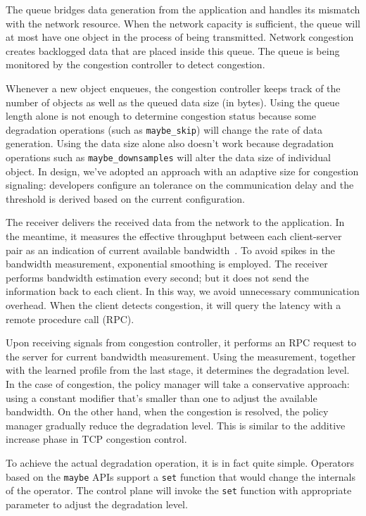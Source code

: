  The queue bridges data generation from the
application and handles its mismatch with the network resource. When the network
capacity is sufficient, the queue will at most have one object in the process of
being transmitted. Network congestion creates backlogged data that are placed
inside this queue. The queue is being monitored by the congestion controller to
detect congestion.

 Whenever a new object enqueues, the congestion
controller keeps track of the number of objects as well as the queued data size
(in bytes). Using the queue length alone is not enough to determine congestion
status because some degradation operations (such as \texttt{maybe\_skip}) will
change the rate of data generation. Using the data size alone also doesn't work
because degradation operations such as \texttt{maybe\_downsamples} will alter
the data size of individual object. In \sysname{} design, we've adopted an
approach with an adaptive size for congestion signaling: developers configure an
tolerance on the communication delay and the threshold is derived based on the
current configuration.

 The receiver delivers the received data from the
network to the application. In the meantime, it measures the effective
throughput between each client-server pair as an indication of current available
bandwidth~\cite{iperf}. To avoid spikes in the bandwidth measurement,
exponential smoothing is employed. The receiver performs bandwidth estimation
every second; but it does not send the information back to each client. In this
way, we avoid unnecessary communication overhead. When the client detects
congestion, it will query the latency with a remote procedure call (RPC).

 Upon receiving signals from congestion controller, it
performs an RPC request to the server for current bandwidth measurement. Using
the measurement, together with the learned profile from the last stage, it
determines the degradation level. In the case of congestion, the policy manager
will take a conservative approach: using a constant modifier that's smaller than
one to adjust the available bandwidth. On the other hand, when the congestion is
resolved, the policy manager gradually reduce the degradation level. This is
similar to the additive increase phase in TCP congestion control.

 To achieve the actual degradation operation, it is in fact quite
simple. Operators based on the \texttt{maybe} APIs support a \texttt{set}
function that would change the internals of the operator. The control plane will
invoke the \texttt{set} function with appropriate parameter to adjust the
degradation level.

